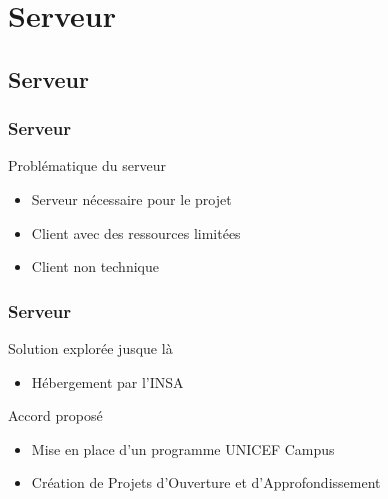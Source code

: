 

\speaker{\Matthieu}
\section{Serveur}
\subsection{Serveur}

\begin{frame}
	\frametitle{Serveur}
	\begin{block}{Problématique du serveur}
      \begin{itemize}
        \item Serveur nécessaire pour le projet
        \item Client avec des ressources limitées
        \item Client non technique
      \end{itemize}
     \end{block}
\end{frame}

\begin{frame}
	\frametitle{Serveur}
	\begin{block}{Solution explorée jusque là}
	\begin{itemize}	
    \item Hébergement par l'INSA
    \end{itemize}
	\end{block}
    
    \begin{block}{Accord proposé}
	\begin{itemize}
		\item Mise en place d'un programme UNICEF Campus
		\item Création de Projets d’Ouverture et d’Approfondissement %
	\end{itemize}
	\end{block}
\end{frame}

